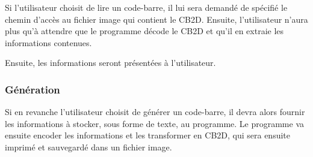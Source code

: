Si l'utilisateur choisit de lire un code-barre, il lui sera demandé de spécifié le chemin d'accès au fichier image qui contient le CB2D. Ensuite, l'utilisateur n'aura plus qu'à attendre que le programme décode le CB2D et qu'il en extraie les informations contenues.

Ensuite, les informations seront présentées à l'utilisateur.

\subsubsection{Génération}

Si en revanche l'utilisateur choisit de générer un code-barre, il devra alors fournir les informations à stocker, sous forme de texte, au programme. Le programme va ensuite encoder les informations et les transformer en CB2D, qui sera ensuite imprimé et sauvegardé dans un fichier image.